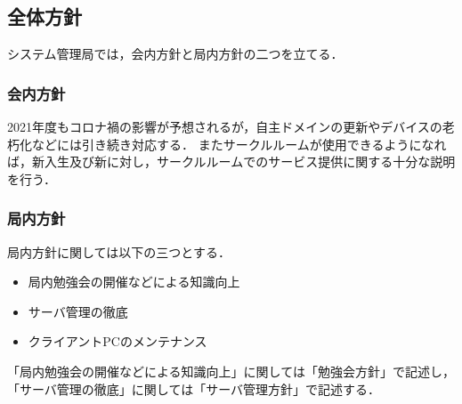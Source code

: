 \subsection*{全体方針}

システム管理局では，会内方針と局内方針の二つを立てる．

\subsubsection*{会内方針}
2021年度もコロナ禍の影響が予想されるが，自主ドメインの更新やデバイスの老朽化などには引き続き対応する．
またサークルルームが使用できるようになれば，新入生及び新\secondGrade{}に対し，サークルルームでのサービス提供に関する十分な説明を行う．

\subsubsection*{局内方針}
局内方針に関しては以下の三つとする．
\begin{itemize}
  \item 局内勉強会の開催などによる知識向上
  \item サーバ管理の徹底
  \item クライアントPCのメンテナンス
\end{itemize}
「局内勉強会の開催などによる知識向上」に関しては「勉強会方針」で記述し，
「サーバ管理の徹底」に関しては「サーバ管理方針」で記述する．
